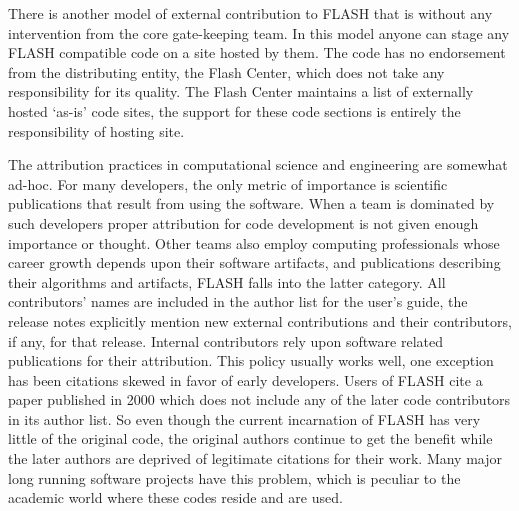There is another model of external contribution to FLASH that is
without any intervention from the core gate-keeping team. In this
model anyone can stage any FLASH compatible code on a site hosted by
them. The code has no endorsement from the distributing entity, the
Flash Center, which does not take any responsibility for its
quality. The Flash Center maintains a list of externally hosted
`as-is' code sites, the support for these code sections is entirely
the responsibility of hosting site. 

The attribution practices in computational science and engineering are
somewhat ad-hoc. For many developers, the only metric of importance is scientific
publications that result from using the software. When a team is
dominated by such developers proper attribution for code development
is not given enough importance or thought. Other teams also employ
computing professionals whose career growth depends upon their
software artifacts, and publications describing their algorithms and
artifacts, FLASH falls into the latter category. All 
contributors' names are included in the author list for the user's
guide, the release notes explicitly mention new external
contributions and their contributors, if any, for that
release. Internal contributors rely upon software related publications
for their attribution. This policy  usually works well, one
exception  has been citations skewed in favor of early
developers. Users of FLASH cite a paper published in 2000
\cite{Fryxell2000} which does not include any of the later code
contributors in its author list.  So even though the current
incarnation of FLASH has very little of the original code, the
original authors continue to get the benefit while the later authors
are deprived of legitimate citations for their work.  Many major long
running software projects have this problem, which is peculiar to the academic world where these
codes reside and are used.  

